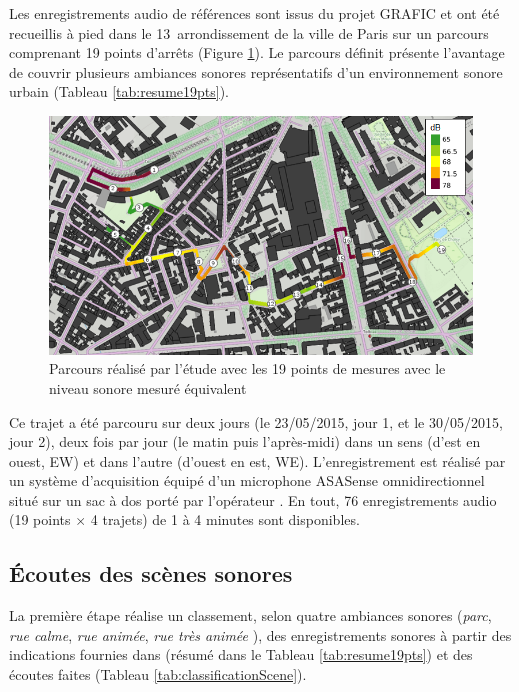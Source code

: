 Les enregistrements audio de références sont issus du projet GRAFIC \cite{aumond2017modeling} et ont été recueillis à pied dans le 13\ieme~arrondissement de la ville de Paris sur un parcours comprenant 19 points d'arrêts (Figure \ref{fig:parcoursGRAFIC}). Le parcours définit présente l'avantage de couvrir plusieurs ambiances sonores représentatifs d'un environnement sonore urbain (Tableau \ref{tab:resume19pts}).\\

\begin{figure}[hbtp]
\centering
\includegraphics[width=.7\textwidth]{./figures/grafic/trajet_19pts.png}
\caption{Parcours réalisé par l'étude avec les 19 points de mesures avec le niveau sonore mesuré équivalent}
\label{fig:parcoursGRAFIC}
\end{figure}

Ce trajet a été parcouru sur deux jours (le 23/05/2015, jour 1, et le 30/05/2015, jour 2), deux fois par jour (le matin puis l'après-midi) dans un sens (d'est en ouest, EW) et dans l'autre (d'ouest en est, WE). L'enregistrement est réalisé par un système d'acquisition équipé d'un microphone ASASense omnidirectionnel situé sur un sac à dos porté par l'opérateur \cite{aumond2017modelling}. En tout, 76 enregistrements audio (19 points $\times$ 4 trajets) de 1 à 4 minutes sont disponibles. \\




\subsection{Écoutes des scènes sonores}

La première étape réalise un classement, selon quatre ambiances sonores (\textit{parc}, \textit{rue calme}, \textit{rue animée}, \textit{rue très animée} \cite{can_describing_2015}), des enregistrements sonores à partir des indications fournies dans \cite{aumond2017modeling} (résumé dans le Tableau \ref{tab:resume19pts}) et des écoutes faites (Tableau \ref{tab:classificationScene}).\\

